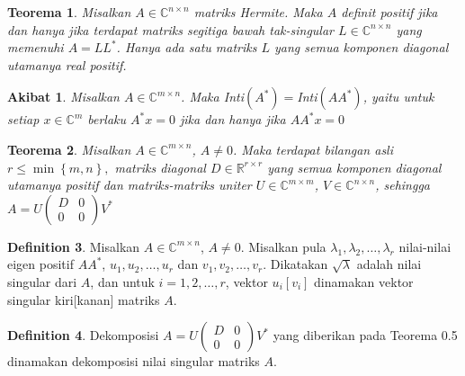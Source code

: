 \documentclass[11pt,a4paper]{article}
\theoremstyle{plain}
\newtheorem{theorem}{Teorema}[section]
\newtheorem{cor}{Akibat}[theorem]
\theoremstyle{definition}
\newtheorem{defn}[theorem]{Definition}
\theoremstyle{remark}
\begin{document}
\begin{enumerate}
	\begin{bfseries}
		\begin{theorem}
			Misalkan $A\in \mathbb{C}^{n\times n}$ matriks Hermite. Maka $A$ definit positif jika dan hanya jika terdapat matriks segitiga bawah tak-singular $L\in \mathbb{C}^{n\times n}$ yang memenuhi $A=LL^{\ast}$. Hanya ada satu matriks $L$ yang semua komponen diagonal utamanya real positif.
		\end{theorem}
	\end{bfseries}

	\begin{bfseries}
		\begin{cor}
			Misalkan $A\in \mathbb{C}^{m\times n}$. Maka Inti$(A^{\ast})=$Inti$(AA^{\ast})$, yaitu untuk setiap $x\in \mathbb{C}^{m}$ berlaku $A^{\ast}x=0$ jika dan hanya jika $AA^{\ast}x=0$
		\end{cor}
	\end{bfseries}

	\begin{bfseries}
		\begin{theorem}
			Misalkan $A\in \mathbb{C}^{m\times n}$, $A\ne 0$. Maka terdapat bilangan asli $r\leq \min\left\{m,n\right\},$ matriks diagonal $D\in\mathbb{R}^{r\times r}$ yang semua komponen diagonal utamanya positif dan matriks-matriks uniter $U\in \mathbb{C}^{m\times m}$, $V\in \mathbb{C}^{n\times n}$, sehingga $A=U\begin{pmatrix}
			D & 0 \\ 0 & 0
			\end{pmatrix}V^{\ast}$
		\end{theorem}
	\end{bfseries}

	\begin{bfseries}
		\begin{defn}
			Misalkan $A\in \mathbb{C}^{m\times n}$, $A\ne 0$. Misalkan pula $\lambda_{1},\lambda_{2},\ldots,\lambda_{r}$ nilai-nilai eigen positif $AA^{\ast}$, $u_{1},u_{2},\ldots,u_{r}$ dan $v_{1},v_{2},\ldots,v_{r}$. Dikatakan $\sqrt{\lambda}$ adalah nilai singular dari $A$, dan untuk $i=1,2,\ldots,r$, vektor $u_{i}[v_{i}]$ dinamakan vektor singular kiri[kanan] matriks $A$.
		\end{defn}
	\end{bfseries}

	\begin{bfseries}
		\begin{defn}
			Dekomposisi $A=U\begin{pmatrix}
			D & 0 \\ 0 & 0
			\end{pmatrix}V^{\ast}$ yang diberikan pada Teorema 0.5 dinamakan dekomposisi nilai singular matriks $A$.
		\end{defn}
	\end{bfseries}


\end{enumerate}
\end{document}
